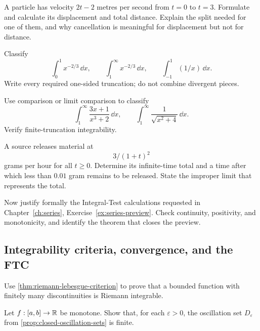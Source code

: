 \begin{exercise}
A particle has velocity $2t-2$ metres per second from $t=0$ to $t=3$. Formulate and calculate its displacement and total distance. Explain the split needed for one of them, and why cancellation is meaningful
for displacement but not for distance.
\end{exercise}

\begin{exercise}
Classify
\[
\int_0^1x^{-2/3}\,\dd x,\qquad
\int_1^\infty x^{-2/3}\,\dd x,\qquad
\int_{-1}^1(1/x)\,\dd x.
\]
Write every required one-sided truncation; do not combine divergent pieces.
\end{exercise}

\begin{exercise}
Use comparison or limit comparison to classify
\[
\int_1^\infty\frac{3x+1}{x^3+2}\,\dd x,\qquad
\int_1^\infty\frac{1}{\sqrt{x^2+4}}\,\dd x.
\]
Verify finite-truncation integrability.
\end{exercise}

\begin{exercise}
A source releases material at
\[
3/(1+t)^2
\]
 grams per hour for all $t\geq0$. Determine its infinite-time total and a time after which less than $0.01$ gram remains to be released. State the improper limit that represents the total.
\end{exercise}

\begin{exercise}
Now justify formally the Integral-Test calculations requested in Chapter~\ref{ch:series}, Exercise~\ref{ex:series-preview}. Check continuity, positivity, and monotonicity, and identify the theorem that closes the preview.
\end{exercise}

\subsection*{Integrability criteria, convergence, and the FTC}

\begin{exercise}
Use \cref{thm:riemann-lebesgue-criterion} to prove that a bounded function
with finitely many discontinuities is Riemann integrable.
\end{exercise}

\begin{exercise}
Let $f:[a,b]\to\mathbb{R}$ be monotone.  Show that, for each $\varepsilon>0$, the oscillation set $D_\varepsilon$
from \cref{prop:closed-oscillation-sets} is finite.
\end{exercise}

